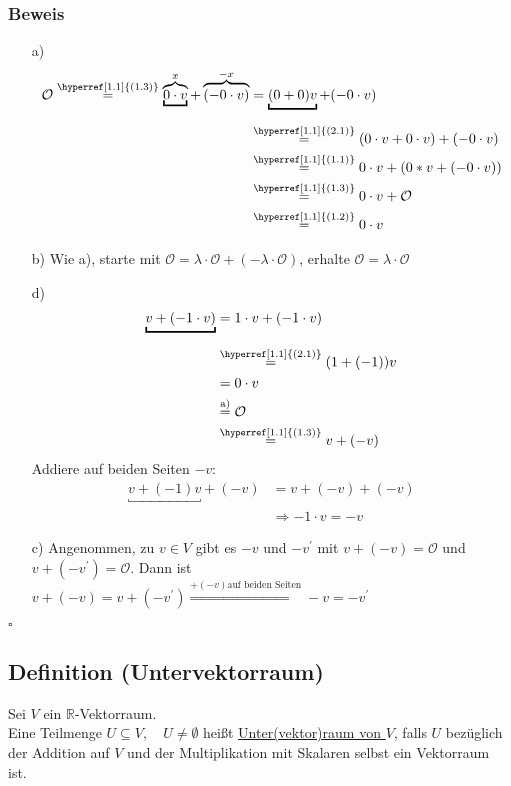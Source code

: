 \documentclass[12pt,titlepage, pdf]{article}
\newcommand{\R}{\mathds{R}}
\renewcommand{\>}{\rightarrow}
\renewcommand{\*}{\cdot}
\renewcommand{\O}{\mathcal{O}}
\begin{document}
	\subsubsection*{Beweis}
	\begin{itemize}
		\item[a)] \begin{align*}
		\O\overset{\textrm{\hyperref[1.1]{(1.3)}}}{=}\overbrace{\underbracket{0\*v}_{}}^{x}+\overbrace{(-0\*v)}^{-x}&=\underbracket{(0+0)v}_{}+(-0\*v)\\
		&\overset{\textrm{\hyperref[1.1]{(2.1)}}}{=}(0\*v+0\*v)+(-0\*v)\\
		&\overset{\textrm{\hyperref[1.1]{(1.1)}}}{=}0\*v+(0*v+(-0\*v))\\
		&\overset{\textrm{\hyperref[1.1]{(1.3)}}}{=}0\*v+\O\\
		&\overset{\textrm{\hyperref[1.1]{(1.2)}}}{=}0\*v
		\end{align*}
		\item[b)] Wie a), starte mit $\O=\lambda\*\O+(-\lambda\*\O)$, erhalte $\O=\lambda\*\O$
		\item[d)] \begin{align*}
		\underbracket{v+(-1\*v)}_{}&=1\*v+(-1\*v)\\
		&\overset{\textrm{\hyperref[1.1]{(2.1)}}}{=}(1+(-1))v\\
		&=0\*v\\
		&\overset{\textrm{a)}}{=}\O\\
		&\overset{\textrm{\hyperref[1.1]{(1.3)}}}{=}v+(-v)
		\end{align*}
		Addiere auf beiden Seiten $-v$:
		\begin{align*}
		\underbracket{v+(-1)v}_{}+(-v)&=v+(-v)+(-v)\\
		&\Rightarrow-1\*v=-v		
		\end{align*}
		\item[c)] Angenommen, zu $v\in V$ gibt es $-v$ und $-v^\prime$ mit $v+(-v)=\O$ und $v+(-v^\prime)=\O$. Dann ist $v+(-v)=v+(-v^\prime)\overset{+(-v)\textrm{auf beiden Seiten}}{\Rightarrow}-v=-v^\prime$
	\end{itemize}
	\hfill$\square$
	\subsection{Definition (Untervektorraum)}
	\label{1.4}
	Sei $V$ ein $\R$-Vektorraum.\\
	Eine Teilmenge $U\subseteq V,\quad U\neq\emptyset$ heißt \underline{Unter(vektor)raum von $V$}, falls $U$ bezüglich der Addition auf $V$ und der Multiplikation mit Skalaren selbst ein Vektorraum ist.
\end{document}
